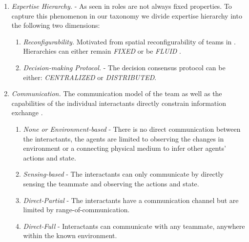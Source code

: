 \documentclass[letterpaper, 10 pt, conference]{ieeeconf}  %
\theoremstyle{definition}
\begin{document}
\begin{enumerate}
\begin{enumerate}
            \item \textit{Expertise Hierarchy.} \cite{Dautenhahn} -
            As seen in \cite{Dautenhahn} roles are not always fixed properties.
            To capture this phenomenon in our taxonomy we divide expertise hierarchy into the following two dimensions:
            \begin{enumerate}
                \item \textit{Reconfigurability.}
                Motivated from spatial reconfigurability of teams in \cite{Dudek2002updated, cao1997cooperative}.
                Hierarchies can either remain \textit{FIXED} \cite{Casper2003, Thrun1999Minerva} or be \textit{FLUID} \cite{mortl2012role}.
                \item \textit{Decision-making Protocol.} \cite{Yanco2004updated, Dudek2002updated, cao1997cooperative} -
                The decision consensus protocol can be either: \textit{CENTRALIZED} or \textit{DISTRIBUTED}.
            \end{enumerate}
            \item \textit{Communication.}
            The communication model of the team as well as the capabilities of the individual interactants directly constrain information exchange \cite{stone2000multiagent, cao1997cooperative, Dudek2002updated}.
            \begin{enumerate}
                \item \textit{None or Environment-based} \cite{cao1997cooperative, stone2000multiagent} -
                There is no direct communication between the interactants, the agents are limited to observing the changes in environment or a connecting physical medium to infer other agents' actions and state.
                \item \textit{Sensing-based} \cite{cao1997cooperative} - 
                The interactants can only communicate by directly sensing the teammate and observing the actions and state.
                \item \textit{Direct-Partial} \cite{cao1997cooperative, Dudek2002updated} -
                The interactants have a communication channel but are limited by range-of-communication.
                \item \textit{Direct-Full} \cite{cao1997cooperative,stone2000multiagent, Dudek2002updated} -
                Interactants can communicate with any teammate, anywhere within the known environment.
            \end{enumerate}
        \end{enumerate}
\end{enumerate}
\end{document}
